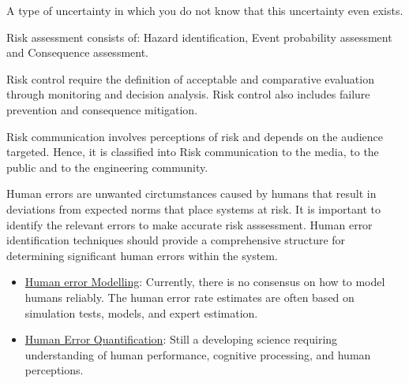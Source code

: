 \begin{definition}
    A type of uncertainty in which you do not know that this uncertainty
    even exists.
\end{definition}

\begin{definition}
    Risk assessment consists of: Hazard identification, Event probability
    assessment and Consequence assessment.
\end{definition}

\begin{definition}
    Risk control require the definition of acceptable and comparative evaluation
    through monitoring and decision analysis. Risk control also includes
    failure prevention and consequence mitigation. 
\end{definition}

\begin{definition}
    Risk communication involves perceptions of risk and depends on the
    audience targeted. Hence, it is classified into Risk communication
    to the media, to the public and to the engineering community.
\end{definition}

\begin{definition}
    Human errors are unwanted circtumstances caused by humans that result
    in deviations from expected norms that place systems at risk.
    It is important to identify the relevant errors to make accurate risk
    asssessment. Human error identification techniques should provide a
    comprehensive structure for determining significant human errors within
    the system.
    \begin{itemize}
        \item \underline{Human error Modelling}: Currently, there is no
            consensus on how to model humans reliably. The human error
            rate estimates are often based on simulation tests, models,
            and expert estimation.
        \item \underline{Human Error Quantification}: Still a developing
            science requiring understanding of human performance, cognitive
            processing, and human perceptions.
    \end{itemize}
\end{definition}
